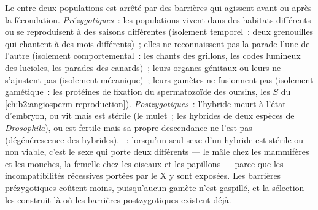 \begin{proposition}\label{prop:b2:speciation:isolation}
Le  entre deux populations est arrêté par des barrières qui
agissent avant ou après la fécondation. \emph{Prézygotiques}~: les
populations vivent dans des habitats différents ou se reproduisent à des
saisons différentes (isolement temporel~: deux grenouilles qui chantent à
des mois différents)~; elles ne reconnaissent pas la parade l'une de
l'autre (isolement comportemental~: les chants des grillons, les codes
lumineux des lucioles, les parades des canards)~; leurs organes génitaux
ou leurs  ne s'ajustent pas (isolement mécanique)~; leurs gamètes
ne fusionnent pas (isolement gamétique~: les protéines de fixation du
spermatozoïde des oursins, les 
$S$ du \cref{ch:b2:angiosperm-reproduction}).
\emph{Postzygotiques}~: l'hybride meurt à l'état d'embryon, ou vit mais
est stérile (le mulet~; les hybrides de deux espèces de \emph{Drosophila}),
ou est fertile mais sa propre descendance ne l'est pas (dégénérescence
des hybrides). \emph{}~: lorsqu'un seul sexe d'un hybride
est stérile ou non viable, c'est le sexe qui porte deux  différents --- le mâle chez les mammifères et les mouches, la
femelle chez les oiseaux et les papillons --- parce que les
incompatibilités récessives portées par le X y sont exposées. Les
barrières prézygotiques coûtent moins, puisqu'aucun gamète n'est gaspillé,
et la sélection les construit là où les barrières postzygotiques existent
déjà.
\end{proposition}


